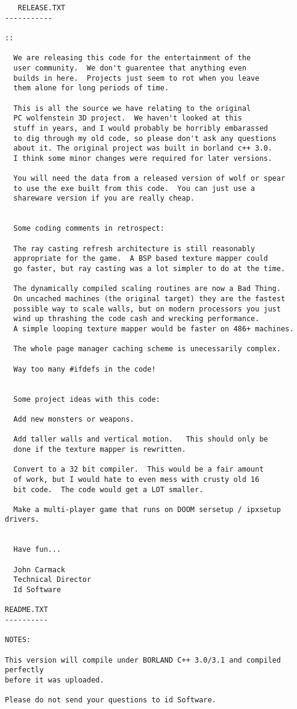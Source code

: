 \documentclass[book.tex]{subfiles}
\begin{document}
 \begin{breakable_box}
   \begin{verbatim}
   RELEASE.TXT
-----------

::

  We are releasing this code for the entertainment of the 
  user community.  We don't guarentee that anything even 
  builds in here.  Projects just seem to rot when you leave 
  them alone for long periods of time.

  This is all the source we have relating to the original 
  PC wolfenstein 3D project.  We haven't looked at this 
  stuff in years, and I would probably be horribly embarassed 
  to dig through my old code, so please don't ask any questions 
  about it. The original project was built in borland c++ 3.0.  
  I think some minor changes were required for later versions.

  You will need the data from a released version of wolf or spear 
  to use the exe built from this code.  You can just use a 
  shareware version if you are really cheap.


  Some coding comments in retrospect:

  The ray casting refresh architecture is still reasonably 
  appropriate for the game.  A BSP based texture mapper could 
  go faster, but ray casting was a lot simpler to do at the time.

  The dynamically compiled scaling routines are now a Bad Thing.  
  On uncached machines (the original target) they are the fastest 
  possible way to scale walls, but on modern processors you just 
  wind up thrashing the code cash and wrecking performance.  
  A simple looping texture mapper would be faster on 486+ machines.

  The whole page manager caching scheme is unecessarily complex.

  Way too many #ifdefs in the code!


  Some project ideas with this code:

  Add new monsters or weapons.

  Add taller walls and vertical motion.   This should only be 
  done if the texture mapper is rewritten.

  Convert to a 32 bit compiler.  This would be a fair amount 
  of work, but I would hate to even mess with crusty old 16 
  bit code.  The code would get a LOT smaller.

  Make a multi-player game that runs on DOOM sersetup / ipxsetup drivers.


  Have fun...

  John Carmack
  Technical Director
  Id Software

README.TXT
----------

NOTES:

This version will compile under BORLAND C++ 3.0/3.1 and compiled perfectly
before it was uploaded. 

Please do not send your questions to id Software.

   \end{verbatim}
 \end{breakable_box}
\end{document}
